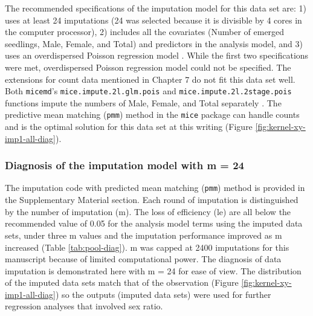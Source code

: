 \documentclass[
]{article}
\begin{document}
The recommended specifications of the imputation model for this data set are: 1) uses at least 24 imputations (24 was selected because it is divisible by 4 cores in the computer processor), 2) includes all the covariates (Number of emerged seedlings, Male, Female, and Total) and predictors in the analysis model, and 3) uses an overdispersed Poisson regression model \citetext{\citealp{azurMultipleImputationChained2011}; \citealp{whiteMultipleImputationUsing2011}; \citealp[and][]{nguyenModelCheckingMultiple2017}}. While the first two specifications were met, overdispersed Poisson regression model could not be specified. The extensions for count data mentioned in Chapter 7 \citep{vanbuurenFlexibleImputationMissing2018} do not fit this data set well. Both \texttt{micemd}'s \texttt{mice.impute.2l.glm.pois} and \texttt{mice.impute.2l.2stage.pois} functions impute the numbers of Male, Female, and Total separately \citep{audigierMicemdMultipleImputation2019}. The predictive mean matching (\texttt{pmm}) method in the \texttt{mice} package can handle counts \citep{vanbuurenMiceMultivariateImputation2011} and is the optimal solution for this data set at this writing (Figure \ref{fig:kernel-xy-imp1-all-diag}).

\hypertarget{diagnosis-of-the-imputation-model-with-m-24}{%
\subsubsection*{Diagnosis of the imputation model with m = 24}\label{diagnosis-of-the-imputation-model-with-m-24}}

The imputation code with predicted mean matching (\texttt{pmm}) method is provided in the Supplementary Material section. Each round of imputation is distinguished by the number of imputation (m). The loss of efficiency (le) are all below the recommended value of 0.05 \citep{whiteMultipleImputationUsing2011} for the analysis model terms using the imputed data sets, under three m values and the imputation performance improved as m increased (Table \ref{tab:pool-diag}). m was capped at 2400 imputations for this manuscript because of limited computational power. The diagnosis of data imputation is demonstrated here with m = 24 for ease of view. The distribution of the imputed data sets match that of the observation (Figure \ref{fig:kernel-xy-imp1-all-diag}) so the outputs (imputed data sets) were used for further regression analyses that involved sex ratio.
\end{document}
